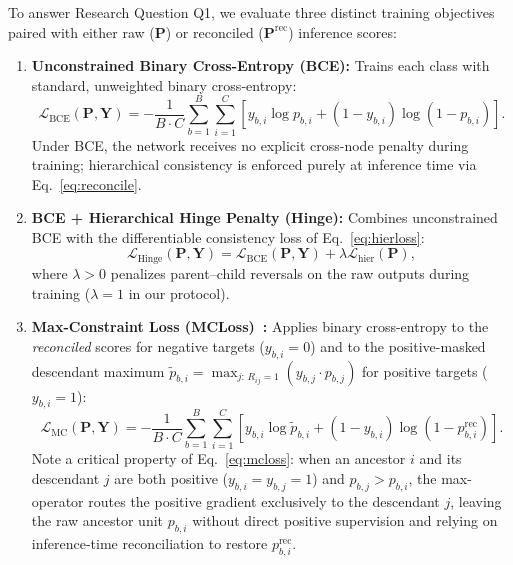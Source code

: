 \documentclass[preprint,12pt]{elsarticle}
\begin{document}
To answer Research Question Q1, we evaluate three distinct training objectives
paired with either raw ($\mathbf{P}$) or reconciled ($\mathbf{P}^{\text{rec}}$)
inference scores:
\begin{enumerate}[leftmargin=*,nosep]
  \item \textbf{Unconstrained Binary Cross-Entropy (BCE):} Trains each class
    with standard, unweighted binary cross-entropy:
    \begin{equation}
    \mathcal{L}_{\text{BCE}}(\mathbf{P}, \mathbf{Y}) = -\frac{1}{B \cdot C}
    \sum_{b=1}^{B} \sum_{i=1}^{C} \left[
    y_{b,i} \log p_{b,i} + (1-y_{b,i}) \log(1-p_{b,i})
    \right].
    \label{eq:bce}
    \end{equation}
    Under BCE, the network receives no explicit cross-node penalty during
    training; hierarchical consistency is enforced purely at inference time via
    Eq.~\eqref{eq:reconcile}.
  \item \textbf{BCE + Hierarchical Hinge Penalty (Hinge):} Combines
    unconstrained BCE with the differentiable consistency loss of
    Eq.~\eqref{eq:hierloss}:
    \begin{equation}
    \mathcal{L}_{\text{Hinge}}(\mathbf{P}, \mathbf{Y}) =
    \mathcal{L}_{\text{BCE}}(\mathbf{P}, \mathbf{Y}) +
    \lambda \mathcal{L}_{\text{hier}}(\mathbf{P}),
    \label{eq:total}
    \end{equation}
    where $\lambda > 0$ penalizes parent--child reversals on the raw outputs
    during training ($\lambda = 1$ in our protocol).
  \item \textbf{Max-Constraint Loss (MCLoss)~\cite{chmcnn}:} Applies binary
    cross-entropy to the \emph{reconciled} scores for negative targets ($y_{b,i}=0$)
    and to the positive-masked descendant maximum
    $\tilde{p}_{b,i} = \max_{j:\, R_{ij}=1} (y_{b,j} \cdot p_{b,j})$ for
    positive targets ($y_{b,i}=1$):
    \begin{equation}
    \mathcal{L}_{\text{MC}}(\mathbf{P}, \mathbf{Y}) = -\frac{1}{B \cdot C}
    \sum_{b=1}^{B} \sum_{i=1}^{C} \left[
    y_{b,i} \log \tilde{p}_{b,i} + (1-y_{b,i}) \log(1-p_{b,i}^{\text{rec}})
    \right].
    \label{eq:mcloss}
    \end{equation}
    Note a critical property of Eq.~\eqref{eq:mcloss}: when an ancestor $i$ and
    its descendant $j$ are both positive ($y_{b,i}=y_{b,j}=1$) and $p_{b,j} >
    p_{b,i}$, the max-operator routes the positive gradient exclusively to the
    descendant $j$, leaving the raw ancestor unit $p_{b,i}$ without direct
    positive supervision and relying on inference-time reconciliation to
    restore $p_{b,i}^{\text{rec}}$.
\end{enumerate}
\end{document}
